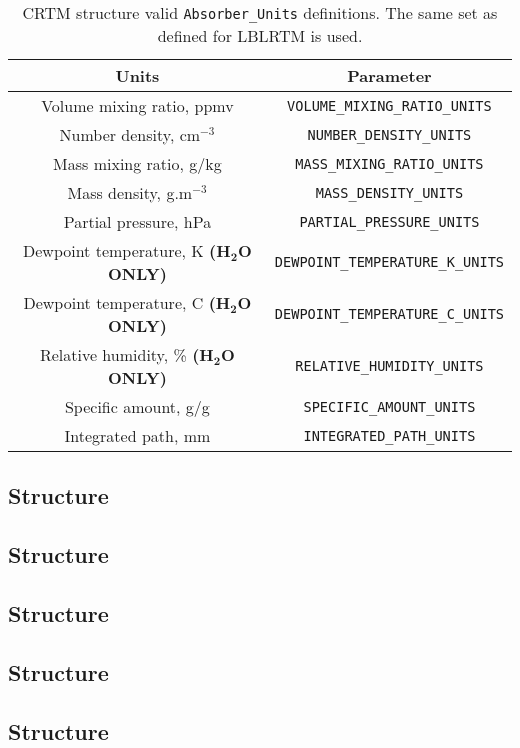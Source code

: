\begin{table}
  \centering
  \begin{tabular}{|c|c|}
    \hline
    \sffamily\textbf{Units} & \sffamily\textbf{Parameter} \\
    \hline\hline
     Volume mixing ratio, ppmv                       & \texttt{VOLUME\_MIXING\_RATIO\_UNITS} \\
     Number density, cm$^{-3}$                       & \texttt{NUMBER\_DENSITY\_UNITS} \\
     Mass mixing ratio, g/kg                         & \texttt{MASS\_MIXING\_RATIO\_UNITS} \\
     Mass density, g.m$^{-3}$                        & \texttt{MASS\_DENSITY\_UNITS} \\
     Partial pressure, hPa                           & \texttt{PARTIAL\_PRESSURE\_UNITS} \\
     Dewpoint temperature, K  \textbf{(H$\mathbf{_2}$O ONLY)} & \texttt{DEWPOINT\_TEMPERATURE\_K\_UNITS} \\
     Dewpoint temperature, C  \textbf{(H$\mathbf{_2}$O ONLY)} & \texttt{DEWPOINT\_TEMPERATURE\_C\_UNITS} \\
     Relative humidity, \%    \textbf{(H$\mathbf{_2}$O ONLY)} & \texttt{RELATIVE\_HUMIDITY\_UNITS} \\
     Specific amount, g/g                            & \texttt{SPECIFIC\_AMOUNT\_UNITS} \\
     Integrated path, mm                             & \texttt{INTEGRATED\_PATH\_UNITS} \\
    \hline
  \end{tabular}
  \caption{CRTM \Atmosphere{} structure valid \texttt{Absorber\_Units} definitions. The same set as defined for LBLRTM is used.}
  \label{tab:absorber_units}
\end{table}


\subsection{\Surface{} Structure}

\subsection{\GeometryInfo{} Structure}

\subsection{\ChannelInfo{} Structure}

\subsection{\RTSolution{} Structure}

\subsection{\Options{} Structure}

